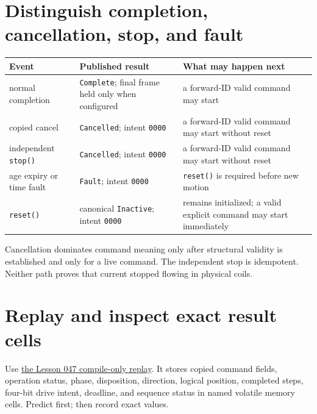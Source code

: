 \documentclass[11pt]{article}
\begin{document}
\section{Distinguish completion, cancellation, stop, and fault}
\begin{tabularx}{\linewidth}{@{}l X X@{}}
\toprule
Event & Published result & What may happen next\\
\midrule
normal completion & \texttt{Complete}; final frame held only when configured
 & a forward-ID valid command may start\\
copied cancel & \texttt{Cancelled}; intent \texttt{0000}
 & a forward-ID valid command may start without reset\\
independent \texttt{stop()} & \texttt{Cancelled}; intent \texttt{0000}
 & a forward-ID valid command may start without reset\\
age expiry or time fault & \texttt{Fault}; intent \texttt{0000}
 & \texttt{reset()} is required before new motion\\
\texttt{reset()} & canonical \texttt{Inactive}; intent \texttt{0000}
 & remains initialized; a valid explicit command may start immediately\\
\bottomrule
\end{tabularx}

Cancellation dominates command meaning only after structural validity is
established and only for a live command. The independent stop is idempotent.
Neither path proves that current stopped flowing in physical coils.

\newpage
\section{Replay and inspect exact result cells}
Use
\href{https://github.com/spincyc/adk/blob/main/examples/Lesson047BoundedStepperSequence/Lesson047BoundedStepperSequence.ino}
{the Lesson 047 compile-only replay}. It stores copied command fields,
operation status, phase, disposition, direction, logical position, completed
steps, four-bit drive intent, deadline, and sequence status in named volatile
memory cells. Predict first; then record exact values.
\end{document}
